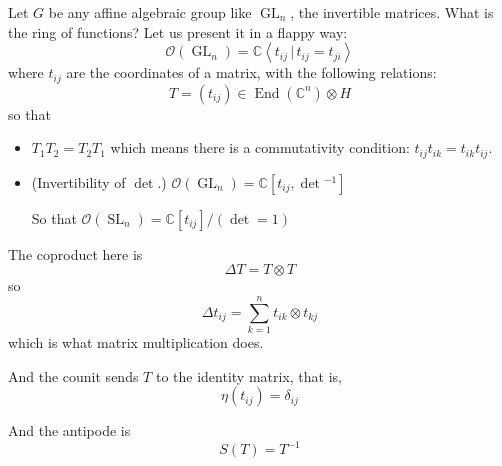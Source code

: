 \begin{example}
\label{example-l1-functions}
Let $G$ be any affine algebraic group like
$\operatorname{GL}_{n}$, the invertible
matrices. What is the ring of functions?
Let us present it in a flappy way:
$$
\mathcal{O}(\operatorname{GL}_{n})=
\mathbb{C}\left\langle{}
t_{ij}\,|\,t_{ij}=t_{ji}
\right\rangle{}
$$
where $t_{ij}$ are the coordinates of a
matrix, with the following relations:
$$
T=(t_{ij})\in
\operatorname{End}(\mathbb{C}^{n})
\otimes H
$$
so that
\begin{itemize}
\item $T_{1}T_{2}=T_{2}T_{1}$
which means there is a commutativity
condition: $t_{ij}t_{ik}=t_{ik}t_{ij}$.

\item (Invertibility of $\det$.)
$\mathcal{O}(\operatorname{GL}_{n})=
\mathbb{C}[t_{ij},\det{}^{-1}]$

So that
$\mathcal{O}(\operatorname{SL}_{n})=
\mathbb{C}[t_{ij}]/(\det =1)$
\end{itemize}
The coproduct here is
$$
\Delta T=T\otimes T
$$
so
$$
\Delta t_{ij}=\sum_{k=1}^{n}
t_{ik}\otimes t_{kj}
$$
which is what matrix multiplication does.

And the counit sends $T$ to the identity
matrix, that is,
$$
\eta(t_{ij})=\delta_{ij}
$$

And the antipode is
$$
S(T)=T^{-1}
$$
\end{example}

